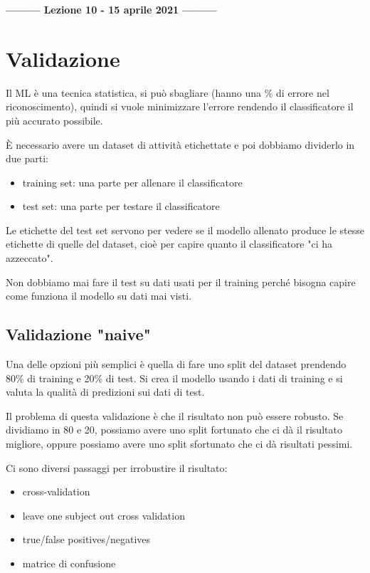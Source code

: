 \begin{center}
    \textbf{--------- Lezione 10 - 15 aprile 2021 ---------}
\end{center}

\section{Validazione}
Il ML è una tecnica statistica, si può sbagliare (hanno una \% di errore nel riconoscimento), quindi si vuole minimizzare l'errore rendendo il classificatore il più accurato possibile. 

È necessario avere un dataset di attività etichettate e poi dobbiamo dividerlo in due parti:
\begin{itemize}
    \item training set: una parte per allenare il classificatore
    \item test set: una parte per testare il classificatore
\end{itemize}

Le etichette del test set servono per vedere se il modello allenato produce le stesse etichette di quelle del dataset, cioè per capire quanto il classificatore "ci ha azzeccato".

Non dobbiamo mai fare il test su dati usati per il training perché bisogna capire come funziona il modello su dati mai visti.

\subsection{Validazione "naive"}
Una delle opzioni più semplici è quella di fare uno split del dataset prendendo 80\% di training e 20\% di test. 
Si crea il modello usando i dati di training e si valuta la qualità di predizioni sui dati di test.

Il problema di questa validazione è che il risultato non può essere robusto. Se dividiamo in 80 e 20, possiamo avere uno split fortunato che ci dà il risultato migliore, oppure possiamo avere uno split sfortunato che ci dà risultati pessimi.

Ci sono diversi passaggi per irrobustire il risultato: 
\begin{itemize}
    \item cross-validation
    \item leave one subject out cross validation
    \item true/false positives/negatives
    \item matrice di confusione
\end{itemize}

